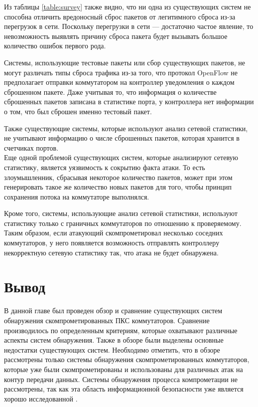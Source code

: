 \documentclass[../thesis.tex]{subfiles}
\begin{document}
Из таблицы \ref{table:survey} также видно, что ни одна из существующих систем не способна отличить вредоносный сброс пакетов от легитимного сброса из-за перегрузок в сети.
Поскольку перегрузки в сети --- достаточно частое явление, то невозможность выявлять причину сброса пакета будет вызывать большое количество ошибок первого рода.

Системы, использующие тестовые пакеты или сбор существующих пакетов, не могут различать типы сброса трафика из-за того, что протокол OpenFlow не предполагает отправки коммутатором на контроллер уведомления о каждом сброшенном пакете.
Даже учитывая то, что информация о количестве сброшенных пакетов записана в статистике порта, у контроллера нет информации о том, что был сброшен именно тестовый пакет.

Также существующие системы, которые используют анализ сетевой статистики, не учитывают информацию о числе сброшенных пакетов, которая хранится в счетчиках портов.
\\

Еще одной проблемой существующих систем, которые анализируют сетевую статистику, является уязвимость к сокрытию факта атаки.
То есть злоумышленник, сбрасывая некоторое количество пакетов, может при этом генерировать такое же количество новых пакетов для того, чтобы принцип сохранения потока на коммутаторе выполнялся.

Кроме того, системы, использующие анализ сетевой статистики, используют статистику только с граничных коммутаторов по отношению к проверяемому.
Таким образом, если атакующий скомпрометировал несколько соседних коммутаторов, у него появляется возможность отправлять контроллеру некорректную сетевую статистику так, что атака не будет обнаружена.

\section{Вывод}

В данной главе был проведен обзор и сравнение существующих систем обнаружения скомпрометированных ПКС коммутаторов.
Сравнение производилось по определенным критериям, которые охватывают различные аспекты систем обнаружения.
Также в обзоре были выделены основные недостатки существующих систем. Необходимо отметить, что в обзоре рассмотрены только системы обнаружения скомпрометированных коммутаторов, которые уже были скомпрометированы и использованы для различных атак на контур передачи данных.
Системы обнаружения процесса компрометации не рассмотрены, так как эта область информационной безопасности уже является хорошо исследованной \cite{axelsson2000intrusion}.
\end{document}
